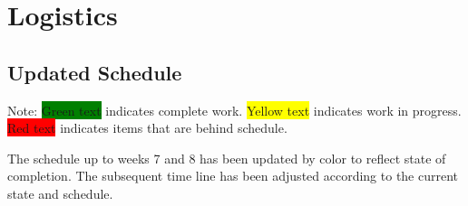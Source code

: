 \documentclass{article}
\begin{document}
\section{Logistics}

	\subsection{Updated Schedule}

	Note: \colorbox{green}{Green text} indicates complete work.  \colorbox{yellow}{Yellow text} indicates work in progress.  \colorbox{red}{Red text} indicates items that are behind schedule.

	The schedule up to weeks 7 and 8 has been updated by color to reflect state of completion.  The subsequent time line has been adjusted according to the current state and schedule.
\end{document}
